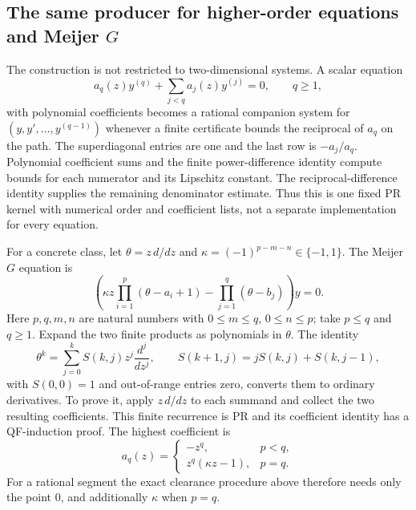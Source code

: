 \subsection{The same producer for higher-order equations and Meijer \texorpdfstring{$G$}{G}}

The construction is not restricted to two-dimensional systems. A scalar equation
\[
 a_q(z)y^{(q)}+\sum_{j<q}a_j(z)y^{(j)}=0,\qquad q\ge1,
\]
with polynomial coefficients becomes a rational companion system for
$(y,y',\ldots,y^{(q-1)})$ whenever a finite certificate bounds the reciprocal
of $a_q$ on the path. The superdiagonal entries are one and the last row is
$-a_j/a_q$. Polynomial coefficient sums and the finite power-difference
identity compute bounds for each numerator and its Lipschitz constant.
The reciprocal-difference identity supplies the remaining denominator
estimate. Thus this is one fixed PR kernel with numerical order and
coefficient lists, not a separate implementation for every equation.

For a concrete class, let $\theta=z\,d/dz$ and
$\kappa=(-1)^{p-m-n}\in\{-1,1\}$. The Meijer $G$ equation \cite{dlmf-meijer} is
\[
 \left(\kappa z\prod_{i=1}^{p}(\theta-a_i+1)
       -\prod_{j=1}^{q}(\theta-b_j)\right)y=0
.
\]
Here $p,q,m,n$ are natural numbers with $0\le m\le q$, $0\le n\le p$; take $p\le q$ and $q\ge1$. Expand the two finite products as
polynomials in $\theta$. The identity
\[
 \theta^k=\sum_{j=0}^k S(k,j)z^j\frac{d^j}{dz^j},\qquad
 S(k+1,j)=jS(k,j)+S(k,j-1),
\]
with $S(0,0)=1$ and out-of-range entries zero, converts them to ordinary
derivatives. To prove it, apply $z\,d/dz$ to each summand and collect the
two resulting coefficients. This finite recurrence is PR and its coefficient
identity has a QF-induction proof. The highest coefficient is
\[
 a_q(z)=
 \begin{cases}-z^q,&p<q,\\z^q(\kappa z-1),&p=q.\end{cases}
\]
For a rational segment the exact clearance procedure above therefore needs
only the point $0$, and additionally $\kappa$ when $p=q$.

